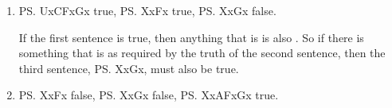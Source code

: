 \begin{enumerate}
\begin{enumerate}
  \item \ps{UxCFxGx} true, \ps{XxFx} true, \ps{XxGx} false.

   \opts{
	\dotline
	\dotline
	\dotline
	\dotline
	\dotline
	\dotline
   }
   {
	If the first sentence is true, then anything that is  is also . So 
	if there is something that is  as required by the truth of the second 
	sentence, then the third sentence, \ps{XxGx}, must also be true.
   }
 
  \item \ps{XxFx} false, \ps{XxGx} false, \ps{XxAFxGx} true.

 \end{enumerate}
 
 


\end{enumerate}  
